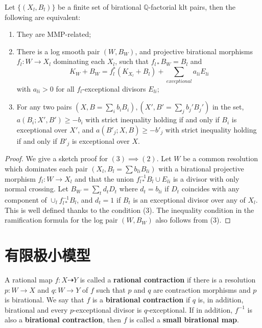 \begin{lem}\label{MMPrelatedConditation}
	\cite[Proposition 3.4]{brunoLogSarkisovProgram1995}
	Let $ \{(X_l,B_l)\} $ be a finite set of birational $ \mathbb{Q} $-factorial klt pairs, then the following are equivalent:
	\begin{enumerate}
		\item They are MMP-related;
		\item There is a log smooth pair $ (W,B_W) $, and projective birational morphisms $ f_l:W\to  X_l $ dominating each $ X_l $, such that $ f_{l*}B_W=B_l $ and
		      \[ K_W+B_W=f_l^*(K_{X_l}+B_l)+\sum_{exceptional}{a_{li}E_{li}} \]
		      with $ a_{li}>0 $ for all $ f_l $-exceptional divisors $E_{li}$;
		\item For any two pairs $ (X,B=\sum_ib_{i }B_i),(X',B'=\sum_{j}b_{j}'B_{j}') $ in the set,  $ a(B_i;X',B')\geqslant -b_i $ with strict inequality holding if and only if $ B_i $ is exceptional over $ X' $, and $ a(B'_j;X,B)\geqslant -b'_j $ with strict inequality holding if and only if $ B'_j $ is exceptional over $ X $.
	\end{enumerate}
\end{lem}
\begin{proof}
	We give a sketch proof for $(3) \implies (2)$. Let $W$ be a common resolution which dominates each pair $(X_l,B_l=\sum b_{li}B_{li})$ with a birational projective morphism $f_l:W\to X_l$ and that the union $f_{l*}^{-1}B_l\cup E_{li}$ is a divisor with only normal crossing. Let $B_W=\sum_t d_tD_t $ where $d_t = b_{li}$ if $D_t$ coincides with any component of $\cup_l f_{l*}^{-1}B_l$, and $d_t=1$ if $B_t$ is an exceptional divisor over any of $X_l$. This is well defined thanks to the condition (3). The inequality condition in the ramification formula for the log pair $(W,B_W)$ also follows from (3).
\end{proof}

\section{有限极小模型}

\begin{defn}
	\cite[\S 2]{haconSarkisovProgram2012} A rational map $f:X\dashrightarrow Y$ is called a \textbf{rational contraction} if there is a resolution $p:W\to X$  and $q:W\to Y$  of $f$  such that $p$  and $q$  are contraction morphisms and $p$  is birational. We say that $f$ is a \textbf{birational contraction} if $q$  is, in addition, birational and every $p$-exceptional divisor is $q$-exceptional. If in addition, $f^{-1}$ is also a \textbf{birational contraction}, then $f$ is called a \textbf{small birational map}.
\end{defn}

